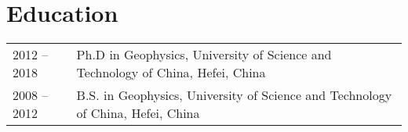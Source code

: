 \section*{Education}
\begin{tabular}{p{} p{}}
2012 -- 2018 & Ph.D in Geophysics, University of Science and Technology of China, Hefei, China \\
2008 -- 2012 & B.S. in Geophysics, University of Science and Technology of China, Hefei, China
\end{tabular}
